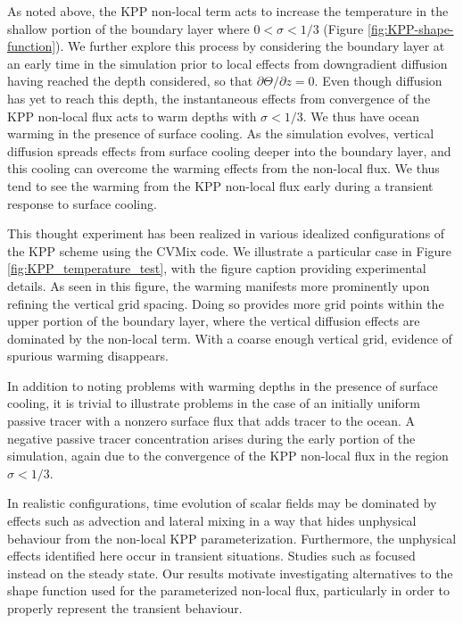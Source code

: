 As noted above, the KPP non-local term acts to increase the
temperature in the shallow portion of the boundary layer where $0 <
\sigma < 1/3$ (Figure \ref{fig:KPP-shape-function}).  We further
explore this process by considering the boundary layer at an early
time in the simulation prior to local effects from downgradient
diffusion having reached the depth considered, so that $\partial
\Theta / \partial z = 0$.  Even though diffusion has yet to reach this
depth, the instantaneous effects from convergence of the KPP non-local
flux acts to warm depths with $\sigma < 1/3$.  We thus have ocean
warming in the presence of surface cooling.  As the simulation
evolves, vertical diffusion spreads effects from surface cooling
deeper into the boundary layer, and this cooling can overcome the
warming effects from the non-local flux.  We thus tend to see the
warming from the KPP non-local flux early during a transient response
to surface cooling.

This thought experiment has been realized in various idealized
configurations of the KPP scheme using the CVMix code. We illustrate a
particular case in Figure \ref{fig:KPP_temperature_test}, with the
figure caption providing experimental details.  As seen in this
figure, the warming manifests more prominently upon refining the
vertical grid spacing.  Doing so provides more grid points within the
upper portion of the boundary layer, where the vertical diffusion
effects are dominated by the non-local term.  With a coarse enough
vertical grid, evidence of spurious warming disappears.

In addition to noting problems with warming depths in the presence of
surface cooling, it is trivial to illustrate problems in the case of
an initially uniform passive tracer with a nonzero surface flux that
adds tracer to the ocean.  A negative passive tracer concentration
arises during the early portion of the simulation, again due to the
convergence of the KPP non-local flux in the region $\sigma < 1/3$.

In realistic configurations, time evolution of scalar fields may be
dominated by effects such as advection and lateral mixing in a way
that hides unphysical behaviour from the non-local KPP
parameterization.  Furthermore, the unphysical effects identified here
occur in transient situations. Studies such as \cite{LargeKPP} focused
instead on the steady state.  Our results motivate investigating
alternatives to the shape function used for the parameterized
non-local flux, particularly in order to properly represent the
transient behaviour.


